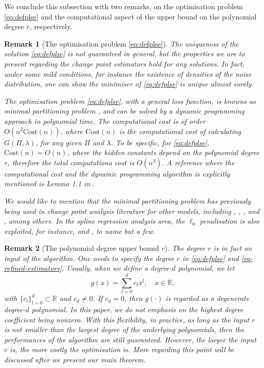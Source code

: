 \documentclass{article}
\newtheorem{remark}{Remark}
\begin{document}
We conclude this subsection with two remarks, on the optimisation problem \eqref{eq:defplse} and the computational aspect of the upper bound on the polynomial degree $r$, respectively.
	
\begin{remark}[The optimisation problem \eqref{eq:defplse}]
The uniqueness of the solution \eqref{eq:defplse} is not guaranteed in general, but the properties we are to present regarding the change point estimators hold for any solutions.  In fact, under some mild conditions, for instance the existence of densities of the noise distribution, one can show the minimiser of \eqref{eq:defplse} is unique almost surely.  

The optimisation problem \eqref{eq:defplse}, with a general loss function, is knowns as minimal partitioning problem \citep[e.g.~Algorithm 1 in][]{FriedrichEtal2008}, and can be solved by a dynamic programming approach in polynomial time.  The computational cost is of order $O(n^2\mathrm{Cost}(n))$, where $\mathrm{Cost}(n)$ is the computational cost of calculating $G(\Pi, \lambda)$, for any given $\Pi$ and $\lambda$.  To be specific, for \eqref{eq:defplse}, $\mathrm{Cost}(n) = O(n)$, where the hidden constants depend on the polynomial degree $r$, therefore the total computationa cost is $O(n^3)$.  A reference where the computational cost and the dynamic programming algorithm is explicitly mentioned is Lemma 1.1 in \cite{chatterjee2019adaptive}. 

We would like to mention that the minimal partitioning problem has previously being used in change point analysis literature for other models, including \cite{fearnhead2018changepoint}, \cite{killick2012optimal}, \cite{wang2020univariate}, \cite{wang2019localizing} and \cite{wang2020detecting}, among others.  In the spline regression analysis area, the $\ell_0$ penalisation is also exploited, for instance, \cite{shen2020phase} and \cite{chatterjee2019adaptive}, to name but a few.    
\end{remark}


\begin{remark}[The polynomial degree upper bound $r$]
The degree $r$ is in fact an input of the algorithm.  One needs to specify the degree $r$ in \eqref{eq:defplse} and \eqref{eq-refined-estimators}.  Usually, when we define a degree-$d$ polynomial, we let 
	\[
		g(x) = \sum_{l = 0}^d c_l x^l, \quad x \in \mathbb{R},
	\]
	with $\{c_l\}_{l = 0}^d \subset \mathbb{R}$ and $c_d \neq 0$.  If $c_d = 0$, then $g(\cdot)$ is regarded as a degenerate degree-$d$ polynomial.  In this paper, we do not emphasis on the highest degree coefficient being nonzero.  With this flexibility, in practice, as long as the input $r$ is not smaller than the largest degree of the underlying polynomials, then the performances of the algorithm are still guaranteed.  However, the larger the input $r$ is, the more costly the optimisation is.  More regarding this point will be discussed after we present our main theorem.
\end{remark}
\end{document}
